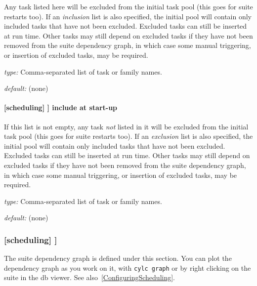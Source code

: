 Any task listed here will be excluded from the initial task pool (this
goes for suite restarts too). If an {\em inclusion} list is also
specified, the initial pool will contain only included tasks that have
not been excluded. Excluded tasks can still be inserted at run time.
Other tasks may still depend on excluded tasks if they have not been
removed from the suite dependency graph, in which case some manual
triggering, or insertion of excluded tasks, may be required.

\begin{myitemize}
    \item {\em type:} Comma-separated list of task or family names.
    \item {\em default:} (none)
\end{myitemize}

\paragraph[include at start-up]{[scheduling] \textrightarrow [[special tasks]] \textrightarrow include at start-up}
\label{IASU}

If this list is not empty, any task {\em not} listed in it will be
excluded from the initial task pool (this goes for suite restarts too).
If an {\em exclusion} list is also specified, the initial pool will
contain only included tasks that have not been excluded. Excluded tasks
can still be inserted at run time. Other tasks may still depend on
excluded tasks if they have not been removed from the suite dependency
graph, in which case some manual triggering, or insertion of excluded
tasks, may be required.

\begin{myitemize}
    \item {\em type:} Comma-separated list of task or family names.
    \item {\em default:} (none)
\end{myitemize}

\subsubsection[{[[}dependencies{]]}]{[scheduling] \textrightarrow [[dependencies]]}

The suite dependency graph is defined under this section.  You can plot
the dependency graph as you work on it, with \lstinline=cylc graph= or
by right clicking on the suite in the db viewer.  See
also~\ref{ConfiguringScheduling}.

